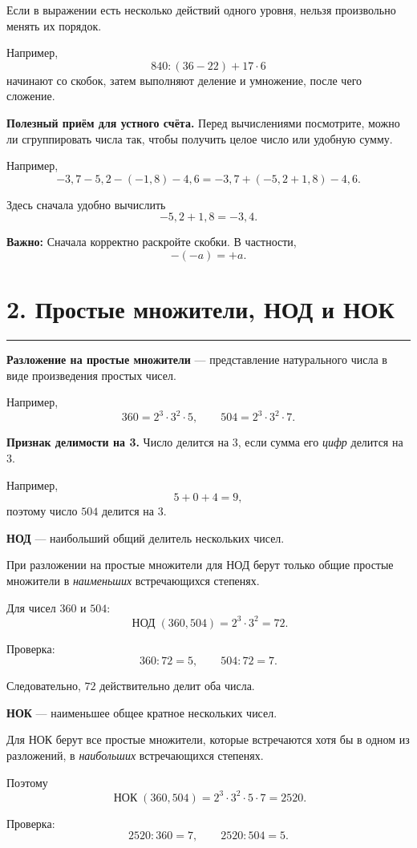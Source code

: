 \documentclass[a4paper,12pt]{article}
\newcommand{\sectionline}{
  \par
  \vspace{-0.35em}
  {\color{accent}\rule{\linewidth}{0.5pt}}
  \vspace{0.55em}
}
\newcommand{\skill}[1]{\textbf{\color{darkaccent}#1}}
\newcommand{\warn}[1]{\textbf{Важно:} #1}
\newcommand{\nodmath}{
  \mathop{\mbox{НОД}}\nolimits
}
\newcommand{\nokmath}{
  \mathop{\mbox{НОК}}\nolimits
}
\begin{document}
Если в выражении есть несколько действий одного уровня,
нельзя произвольно менять их порядок.

Например,
\[
840:(36-22)+17\cdot 6
\]
начинают со скобок, затем выполняют деление и умножение,
после чего сложение.

\skill{Полезный приём для устного счёта.}
Перед вычислениями посмотрите, можно ли сгруппировать числа так,
чтобы получить целое число или удобную сумму.

Например,
\[
-3,7-5,2-(-1,8)-4,6
=
-3,7+(-5,2+1,8)-4,6.
\]

Здесь сначала удобно вычислить
\[
-5,2+1,8=-3,4.
\]

\warn{Сначала корректно раскройте скобки.}
В частности,
\[
-(-a)=+a.
\]


\section*{2. Простые множители, НОД и НОК}
\sectionline

\skill{Разложение на простые множители}
--- представление натурального числа в виде произведения простых чисел.

Например,
\[
360=2^3\cdot 3^2\cdot 5,
\qquad
504=2^3\cdot 3^2\cdot 7.
\]

\skill{Признак делимости на 3.}
Число делится на $3$, если сумма его \emph{цифр}
делится на $3$.

Например,
\[
5+0+4=9,
\]
поэтому число $504$ делится на $3$.

\skill{НОД}
--- наибольший общий делитель нескольких чисел.

При разложении на простые множители для НОД берут только
общие простые множители в \emph{наименьших}
встречающихся степенях.

Для чисел $360$ и $504$:
\[
\nodmath(360,504)
=
2^3\cdot 3^2
=
72.
\]

Проверка:
\[
360:72=5,
\qquad
504:72=7.
\]

Следовательно, $72$ действительно делит оба числа.

\skill{НОК}
--- наименьшее общее кратное нескольких чисел.

Для НОК берут все простые множители,
которые встречаются хотя бы в одном из разложений,
в \emph{наибольших} встречающихся степенях.

Поэтому
\[
\nokmath(360,504)
=
2^3\cdot 3^2\cdot 5\cdot 7
=
2520.
\]

Проверка:
\[
2520:360=7,
\qquad
2520:504=5.
\]
\end{document}
